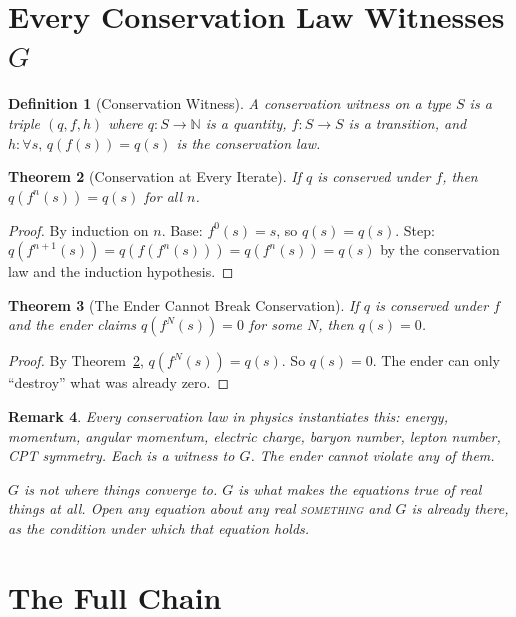 \documentclass[12pt,a4paper]{article}
\newtheorem{theorem}{Theorem}[section]
\newtheorem{definition}[theorem]{Definition}
\newtheorem{remark}[theorem]{Remark}
\begin{document}
\section{Every Conservation Law Witnesses $G$}

\begin{definition}[Conservation Witness]
A \emph{conservation witness} on a type $S$ is a triple
$(q, f, h)$ where $q : S \to \mathbb{N}$ is a quantity,
$f : S \to S$ is a transition, and $h : \forall s,\, q(f(s)) = q(s)$
is the conservation law.
\end{definition}

\begin{theorem}[Conservation at Every Iterate]\label{thm:conservation}
If $q$ is conserved under $f$, then $q(f^n(s)) = q(s)$ for all $n$.
\end{theorem}

\begin{proof}
By induction on $n$. Base: $f^0(s) = s$, so $q(s) = q(s)$. Step:
$q(f^{n+1}(s)) = q(f(f^n(s))) = q(f^n(s)) = q(s)$ by the conservation
law and the induction hypothesis.
\end{proof}

\begin{theorem}[The Ender Cannot Break Conservation]\label{thm:ender-conservation}
If $q$ is conserved under $f$ and the ender claims $q(f^N(s)) = 0$
for some $N$, then $q(s) = 0$.
\end{theorem}

\begin{proof}
By Theorem~\ref{thm:conservation}, $q(f^N(s)) = q(s)$. So $q(s) = 0$.
The ender can only ``destroy'' what was already zero.
\end{proof}

\begin{remark}
Every conservation law in physics instantiates this: energy, momentum,
angular momentum, electric charge, baryon number, lepton number, CPT
symmetry. Each is a witness to $G$. The ender cannot violate any of them.

$G$ is not where things converge to. $G$ is what makes the equations
true of real things at all. Open any equation about any real
\textsc{something} and $G$ is already there, as the condition under
which that equation holds.
\end{remark}

\section{The Full Chain}
\end{document}
